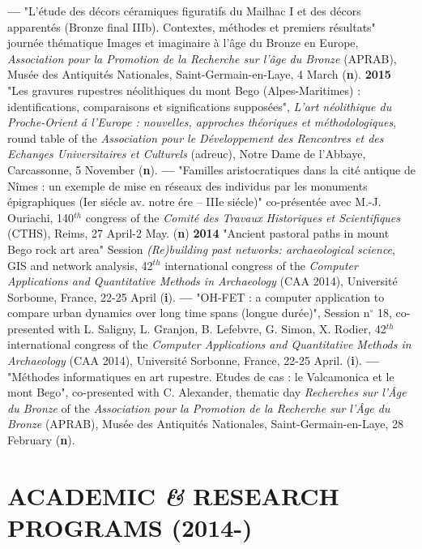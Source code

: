 \documentclass{article}
\begin{document}
\smallbreak
\textbf{--- }"L'\'{e}tude des d\'{e}cors c\'{e}ramiques figuratifs du Mailhac I et des d\'{e}cors apparent\'{e}s (Bronze final IIIb). Contextes, m\'{e}thodes et premiers r\'{e}sultats" journ\'{e}e th\'{e}matique Images et imaginaire \`{a} l'\^{a}ge du Bronze en Europe, \textit{Association pour la Promotion de la Recherche sur l'\^{a}ge du Bronze} (APRAB), Mus\'{e}e des Antiquit\'{e}s Nationales, Saint-Germain-en-Laye, 4 March (\textbf{n}).
\smallbreak
\textbf{2015 }"Les gravures rupestres n\'{e}olithiques du mont Bego (Alpes-Maritimes) : identifications, comparaisons et significations suppos\'{e}es", \textit{L'art n\'{e}olithique du Proche-Orient \'{a} l'Europe : nouvelles, approches th\'{e}oriques et m\'{e}thodologiques}, round table of the \textit{Association pour le D\'{e}veloppement des Rencontres et des Echanges Universitaires et Culturels} (adreuc), Notre Dame de l'Abbaye, Carcassonne, 5 November (\textbf{n}).
\smallbreak
\textbf{--- }"Familles aristocratiques dans la cit\'{e} antique de N\^{i}mes : un exemple de mise en r\'{e}seaux des individus par les monuments \'{e}pigraphiques (Ier si\'{e}cle av. notre \'{e}re -- IIIe si\'{e}cle)" co-pr\'{e}sent\'{e}e avec M.-J. Ouriachi, 140${}^{th}$ congress of the \textit{Comit\'{e} des Travaux Historiques et Scientifiques} (CTHS), Reims, 27 April-2 May. (\textbf{n})
\smallbreak
\textbf{2014 }"Ancient pastoral paths in mount Bego rock art area" Session \textit{(Re)building past networks: archaeological science}, GIS and network analysis, 42${}^{th}$ international congress of the \textit{Computer Applications and Quantitative Methods in Archaeology} (CAA 2014), Universit\'{e} Sorbonne, France, 22-25 April (\textbf{i}).
\smallbreak
\textbf{--- }"OH-FET : a computer application to compare urban dynamics over long time spans (longue dur\'{e}e)", Session n$\mathrm{{}^\circ}$ 18, co-presented with L. Saligny, L. Granjon, B. Lefebvre, G. Simon, X. Rodier, 42${}^{th}$ international congress of the \textit{Computer Applications and Quantitative Methods in Archaeology} (CAA 2014), Universit\'{e} Sorbonne, France, 22-25 April. (\textbf{i}).
\smallbreak
\textbf{--- }"M\'{e}thodes informatiques en art rupestre. Etudes de cas : le Valcamonica et le mont Bego", co-presented with C. Alexander, thematic day \textit{Recherches sur l'\^{A}ge du Bronze }of the\textit{ Association pour la Promotion de la Recherche sur l'\^{A}ge du Bronze }(APRAB), Mus\'{e}e des Antiquit\'{e}s Nationales, Saint-Germain-en-Laye, 28 February (\textbf{n}).

\section{ACADEMIC \textit{\&} RESEARCH PROGRAMS (2014-)}
\end{document}
